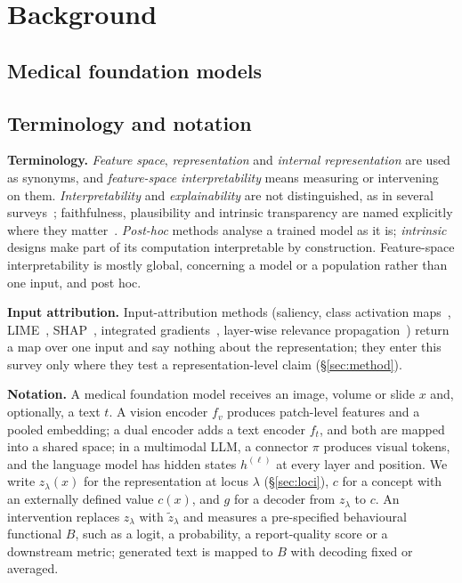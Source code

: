 \section{Background}
\label{sec:background}

\subsection{Medical foundation models}
\label{sec:models}



\subsection{Terminology and notation}
\label{sec:prelim}

\textbf{Terminology.} \emph{Feature space}, \emph{representation} and \emph{internal representation}
are used as synonyms, and \emph{feature-space interpretability} means measuring or intervening on them.
\emph{Interpretability} and \emph{explainability} are not distinguished, as in several
surveys~\cite{wan2025survey}; faithfulness, plausibility and intrinsic transparency are named explicitly
where they matter~\cite{lipton2016mythos,rudin2018stop,rudin2021interpretable}. \emph{Post-hoc} methods
analyse a trained model as it is; \emph{intrinsic} designs make part of its computation interpretable by
construction. Feature-space interpretability is mostly global, concerning a model or a population rather
than one input, and post hoc.

\textbf{Input attribution.} Input-attribution methods (saliency, class activation
maps~\cite{selvaraju2017gradcam}, LIME~\cite{ribeiro2016why}, SHAP~\cite{lundberg2017unified},
integrated gradients~\cite{sundararajan2017axiomatic}, layer-wise relevance
propagation~\cite{bach2015pixel}) return a map over one input and say nothing about the
representation; they enter this survey only where they test a representation-level claim
(\S\ref{sec:method}).

\textbf{Notation.} A medical foundation model receives an image, volume or slide $x$ and, optionally, a
text $t$. A vision encoder $f_v$ produces patch-level features and a pooled embedding; a dual encoder
adds a text encoder $f_t$, and both are mapped into a shared space; in a multimodal LLM, a connector
$\pi$ produces visual tokens, and the language model has hidden states $h^{(\ell)}$ at every layer and
position. We write $z_\lambda(x)$ for the representation at locus $\lambda$ (\S\ref{sec:loci}), $c$ for
a concept with an externally defined value $c(x)$, and $g$ for a decoder from $z_\lambda$ to $c$. An
intervention replaces $z_\lambda$ with $\tilde z_\lambda$ and measures a pre-specified behavioural
functional $B$, such as a logit, a probability, a report-quality score or a downstream metric; generated
text is mapped to $B$ with decoding fixed or averaged.

